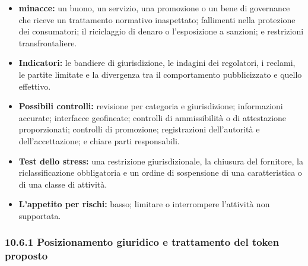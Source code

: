\documentclass[11pt]{article}
\begin{document}
\begin{itemize}[leftmargin=*]
\item \textbf{minacce:} un buono, un servizio, una promozione o un bene di governance che riceve un trattamento normativo inaspettato; fallimenti nella protezione dei consumatori; il riciclaggio di denaro o l'esposizione a sanzioni; e restrizioni transfrontaliere.
\item \textbf{Indicatori:} le bandiere di giurisdizione, le indagini dei regolatori, i reclami, le partite limitate e la divergenza tra il comportamento pubblicizzato e quello effettivo.
\item \textbf{Possibili controlli:} revisione per categoria e giurisdizione; informazioni accurate; interfacce geofineate; controlli di ammissibilità o di attestazione proporzionati; controlli di promozione; registrazioni dell'autorità e dell'accettazione; e chiare parti responsabili.
\item \textbf{Test dello stress:} una restrizione giurisdizionale, la chiusura del fornitore, la riclassificazione obbligatoria e un ordine di sospensione di una caratteristica o di una classe di attività.
\item \textbf{L'appetito per rischi:} basso; limitare o interrompere l'attività non supportata.
\end{itemize}
\subsubsection*{10.6.1 Posizionamento giuridico e trattamento del token proposto}
\end{document}
